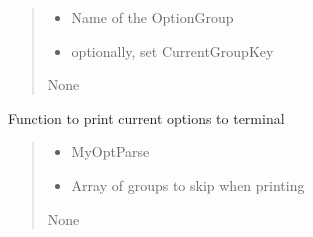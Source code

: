 \documentclass[letterpaper,10pt,english]{sphinxmanual}
\begin{document}
\begin{fulllineitems}
\begin{fulllineitems}
\begin{quote}
\begin{description}
\begin{itemize}
\item {} 
\sphinxAtStartPar
{} \textendash{} Name of the OptionGroup

\item {} 
\sphinxAtStartPar
{} \textendash{} optionally, set CurrentGroupKey

\end{itemize}

\sphinxAtStartPar
None

\end{description}\end{quote}

\end{fulllineitems}


\begin{fulllineitems}
\label{\detokenize{api/killMS.Parset:killMS.Parset.MyOptParse.MyOptParse.Print}}
\pysigstartsignatures
{}
\pysigstopsignatures
\sphinxAtStartPar
Function to print current options to terminal
\begin{quote}\begin{description}
\begin{itemize}
\item {} 
\sphinxAtStartPar
{} \textendash{} MyOptParse

\item {} 
\sphinxAtStartPar
{} \textendash{} Array of groups to skip when printing

\end{itemize}

\sphinxAtStartPar
None

\end{description}\end{quote}

\end{fulllineitems}



\end{fulllineitems}
\end{document}
